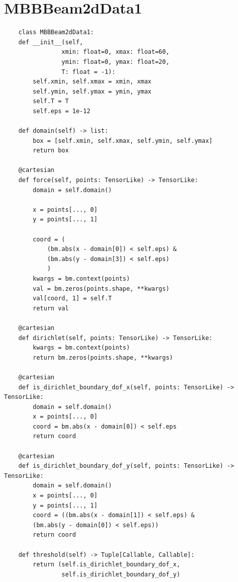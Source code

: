 \documentclass[mathpazo]{cicp}
\begin{document}
\section{MBBBeam2dData1}
\label{sec:code_mbb}
\begin{lstlisting}
	class MBBBeam2dData1:
	def __init__(self, 
				xmin: float=0, xmax: float=60, 
				ymin: float=0, ymax: float=20,
				T: float = -1):
		self.xmin, self.xmax = xmin, xmax
		self.ymin, self.ymax = ymin, ymax
		self.T = T
		self.eps = 1e-12
	
	def domain(self) -> list:
		box = [self.xmin, self.xmax, self.ymin, self.ymax]
		return box
	
	@cartesian
	def force(self, points: TensorLike) -> TensorLike:
		domain = self.domain()
		
		x = points[..., 0]
		y = points[..., 1]
		
		coord = (
			(bm.abs(x - domain[0]) < self.eps) & 
			(bm.abs(y - domain[3]) < self.eps)
			)
		kwargs = bm.context(points)
		val = bm.zeros(points.shape, **kwargs)
		val[coord, 1] = self.T
		return val
	
	@cartesian
	def dirichlet(self, points: TensorLike) -> TensorLike:
		kwargs = bm.context(points)
		return bm.zeros(points.shape, **kwargs)
	
	@cartesian
	def is_dirichlet_boundary_dof_x(self, points: TensorLike) -> TensorLike:
		domain = self.domain()
		x = points[..., 0]
		coord = bm.abs(x - domain[0]) < self.eps
		return coord
	
	@cartesian
	def is_dirichlet_boundary_dof_y(self, points: TensorLike) -> TensorLike:
		domain = self.domain()
		x = points[..., 0]
		y = points[..., 1]
		coord = ((bm.abs(x - domain[1]) < self.eps) &
		(bm.abs(y - domain[0]) < self.eps))
		return coord
	
	def threshold(self) -> Tuple[Callable, Callable]:
		return (self.is_dirichlet_boundary_dof_x, 
				self.is_dirichlet_boundary_dof_y)
\end{lstlisting}
\end{document}
